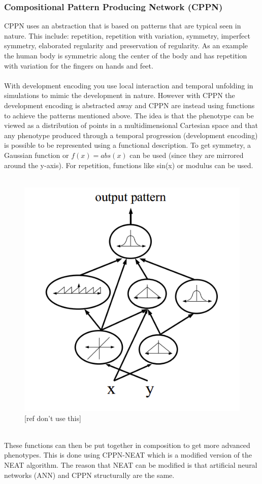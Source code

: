 \documentclass[11pt, a4paper]{article}
\begin{document}
\subsubsection{Compositional Pattern Producing Network (CPPN)}
CPPN uses an abstraction that is based on patterns that are typical seen in nature. This include: repetition, repetition with variation, symmetry, imperfect symmetry, elaborated regularity and preservation of regularity. As an example the human body is symmetric along the center of the body and has repetition with variation for the fingers on hands and feet.
\\ \\
With development encoding you use local interaction and temporal unfolding in simulations to mimic the development in nature. However with CPPN the development encoding is abstracted away and CPPN are instead using functions to achieve the patterns mentioned above. The idea is that the phenotype can be viewed as a distribution of points in a multidimensional Cartesian space and that any phenotype produced through a temporal progression (development encoding) is possible to be represented using a functional description. To get symmetry, a Gaussian function or $ f(x) = abs(x) $ can be used (since they are mirrored around the y-axis). For repetition, functions like sin(x) or modulus can be used. 
\\ \\
\begin{figure}[!ht]
\centering
\includegraphics[scale=0.4]{CompositionOfFunctions}
\caption{[ref don't use this]}
\end{figure}
\\
These functions can then be put together in composition to get more advanced phenotypes. This is done using CPPN-NEAT which is a modified version of the NEAT algorithm. The reason that NEAT can be modified is that artificial neural networks (ANN) and CPPN structurally are the same.
\end{document}

